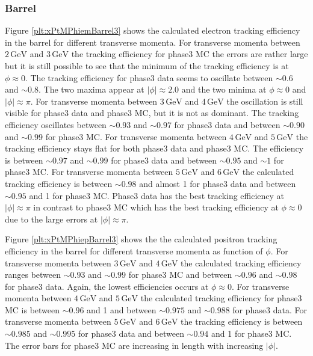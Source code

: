\documentclass[a4paper,11pt,twosided,final,german,openbib,pdftex,listof=totoc,bibliography=totoc]{scrbook}
\begin{document}
\newpage
\subsubsection{Barrel}


Figure \ref{plt:xPtMPhiemBarrel3} shows the calculated electron tracking efficiency in the barrel for different transverse momenta.
For transverse momenta between $2\,\textrm{GeV}$ and $3\,\textrm{GeV}$ the tracking efficiency for phase3 MC the errors are rather large but it is still possible to see that the minimum of the tracking efficiency is at $\phi \approx 0$. The tracking efficiency for phase3 data seems to oscillate between $\sim 0.6$ and $\sim 0.8$. The two maxima appear at $|\phi| \approx 2.0$ and the two minima at $\phi \approx 0$ and $|\phi| \approx \pi$.
For transverse momenta between $3\,\textrm{GeV}$ and $4\,\textrm{GeV}$ the oscillation is still visible for phase3 data and phase3 MC, but it is not as dominant. The tracking efficiency oscillates between $\sim 0.93$ and  $\sim 0.97$ for phase3 data and between $\sim 0.90$ and $\sim 0.99$ for phase3 MC.
For transverse momenta between $4\,\textrm{GeV}$ and $5\,\textrm{GeV}$ the tracking efficiency stays flat for both phase3 data and phase3 MC. The efficiency is between $\sim 0.97$ and $\sim 0.99$ for phase3 data and between $\sim 0.95$ and $\sim 1$ for phase3 MC.
For transverse momenta between $5\,\textrm{GeV}$ and $6\,\textrm{GeV}$ the calculated tracking efficiency is between $\sim 0.98$ and almost 1 for phase3 data and between $\sim 0.95$ and 1 for phase3 MC. Phase3 data has the best tracking efficiency at $|\phi| \approx \pi$ in contrast to phase3 MC which has the best tracking efficiency at $\phi \approx 0$ due to the large errors at $|\phi| \approx \pi$. 

Figure \ref{plt:xPtMPhiepBarrel3} shows the the calculated positron tracking efficiency in the barrel for different transverse momenta as function of $\phi$.
For transverse momenta between $3\,\textrm{GeV}$ and $4\,\textrm{GeV}$ the calculated tracking efficiency ranges between $\sim 0.93$ and $\sim 0.99$ for phase3 MC and between $\sim 0.96$ and $\sim 0.98$ for phase3 data. Again, the lowest efficiencies occurs at $\phi \approx 0$.
For transverse momenta between $4\,\textrm{GeV}$ and $5\,\textrm{GeV}$ the calculated tracking efficiency for phase3 MC is between $\sim 0.96$ and 1 and between $\sim 0.975$ and $\sim 0.988$ for phase3 data. 
For transverse momenta between $5\,\textrm{GeV}$ and $6\,\textrm{GeV}$ the tracking efficiency is between $\sim 0.985$ and $\sim 0.995$ for phase3 data and between $\sim 0.94$ and 1 for phase3 MC. The error bars for phase3 MC are increasing in length with increasing $|\phi|$.
\end{document}
